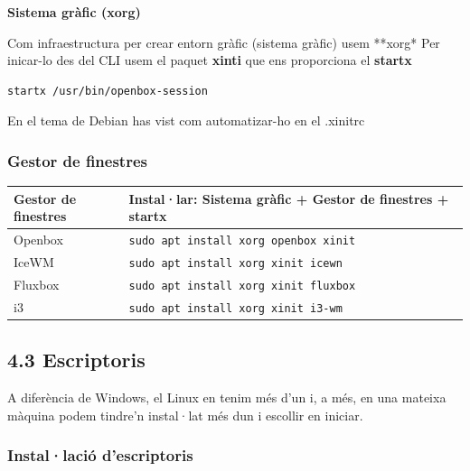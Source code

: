 \documentclass[
  catalan,
  a4paper,
]{article}
\begin{document}
\textbf{Sistema gràfic (xorg)}

Com infraestructura per crear entorn gràfic (sistema gràfic) usem
**xorg* Per inicar-lo des del CLI usem el paquet \textbf{xinti} que ens
proporciona el \textbf{startx}

\begin{verbatim}
startx /usr/bin/openbox-session
\end{verbatim}

En el tema de Debian has vist com automatizar-ho en el .xinitrc

\subsubsection{Gestor de finestres}\label{gestor-de-finestres}

\begin{longtable}[]{@{}
  >{\raggedright\arraybackslash}p{}
  >{\raggedright\arraybackslash}p{}@{}}
\toprule\noalign{}
\begin{minipage}[b]{\linewidth}\raggedright
\textbf{Gestor de finestres}
\end{minipage} & \begin{minipage}[b]{\linewidth}\raggedright
Instal·lar: Sistema gràfic + Gestor de finestres + startx
\end{minipage} \\
\midrule\noalign{}
\endhead
\bottomrule\noalign{}
\endlastfoot
Openbox & \texttt{sudo\ apt\ install\ xorg\ openbox\ xinit} \\
IceWM & \texttt{sudo\ apt\ install\ xorg\ xinit\ icewn} \\
Fluxbox & \texttt{sudo\ apt\ install\ xorg\ xinit\ fluxbox} \\
i3 & \texttt{sudo\ apt\ install\ xorg\ xinit\ i3-wm} \\
\end{longtable}

\subsection{4.3 Escriptoris}\label{escriptoris}

A diferència de Windows, el Linux en tenim més d'un i, a més, en una
mateixa màquina podem tindre'n instal·lat més dun i escollir en iniciar.

\subsubsection{Instal·lació
d'escriptoris}\label{installaciuxf3-descriptoris}
\end{document}
